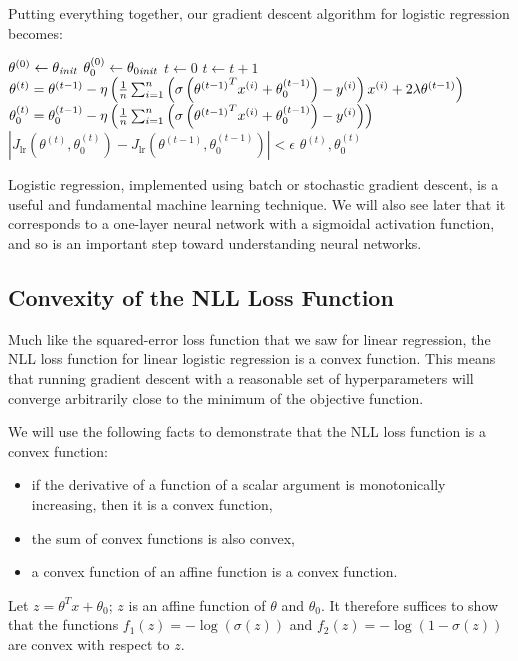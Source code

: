 
  Putting everything together, our gradient descent algorithm for logistic
  regression becomes:
  \begin{codebox}
    \li $\theta^{(0)} \gets \theta_{\it init}$
    \li $\theta_0^{(0)} \gets \theta_{0 {\it init}}$
    \li $t \gets 0$
    \li \Repeat
    \li   $t \gets t+1$
    \li   $\theta^{(t)} = \theta^{(t-1)} - \eta\left(\frac{1}{n}\sum_{i=1}^n
      \left(\sigma\left({\theta^{(t-1)}}^T x^{(i)} + \theta_0^{(t-1)}\right) -
        y^{(i)}\right) x^{(i)}
      + 2\lambda\theta^{(t-1)}
      \right)$
    \li   $\theta_0^{(t)} = \theta_0^{(t-1)} - \eta\left(\frac{1}{n}\sum_{i=1}^n
      \left(\sigma\left({\theta^{(t-1)}}^T x^{(i)} + \theta_0^{(t-1)}\right) -
        y^{(i)} \right)
      \right)$
    \li \Until $\left| J_{\text{lr}}(\theta^{(t)},\theta_0^{(t)}) - J_{\text{lr}}(\theta^{(t-1)},
      \theta_0^{(t-1)}) \right| <\epsilon$
    \li \Return $\theta^{(t)},\theta_0^{(t)}$
  \end{codebox}


  Logistic regression, implemented using batch or stochastic gradient
  descent, is a useful and fundamental machine learning technique. We
  will also see later that it corresponds to a one-layer neural network
  with a sigmoidal activation function, and so is an important step
  toward understanding neural networks.

  \subsection{Convexity of the NLL Loss Function}

  Much like the squared-error loss function that we saw for linear regression,
  the NLL loss function for linear logistic regression is a convex function.
  This means that running gradient descent with a reasonable set of hyperparameters
  will converge arbitrarily close to the minimum of the objective function.

  We will use the following facts to demonstrate that the NLL loss function is a convex function:
  \begin{itemize}
    \item if the derivative of a function of a scalar argument is monotonically increasing, then it is a convex function,
    \item the sum of convex functions is also convex,
    \item a convex function of an affine function is a convex function.
  \end{itemize}
  Let $z=\theta^T x + \theta_0$; $z$ is an affine function of $\theta$ and $\theta_0$.
  It therefore suffices to show that the functions $f_1(z) = - \log (\sigma(z))$ and
$f_2 (z) = -\log (1 - \sigma(z))$ are convex with respect to $z$.

